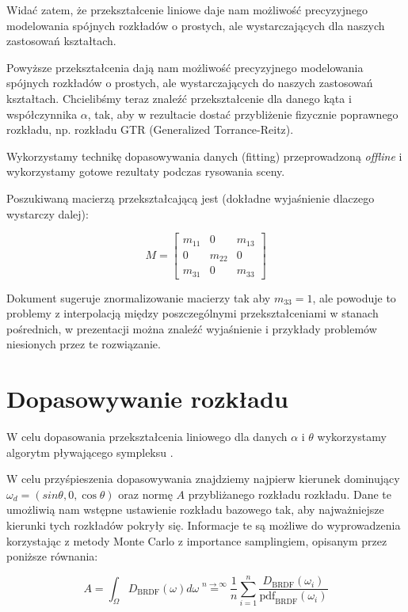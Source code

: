 \documentclass[../main.tex]{subfiles}
\begin{document}
Widać zatem, że przekształcenie liniowe daje nam możliwość precyzyjnego
modelowania spójnych rozkładów o prostych, ale wystarczających dla naszych
zastosowań kształtach.

Powyższe przekształcenia dają nam możliwość precyzyjnego modelowania
spójnych rozkładów o prostych, ale wystarczających do naszych zastosowań
kształtach. Chcielibśmy teraz znaleźć przekształcenie dla danego kąta
i współczynnika $\alpha$, tak, aby w rezultacie dostać przybliżenie
fizycznie poprawnego rozkładu, np. rozkładu GTR (Generalized
Torrance-Reitz).

Wykorzystamy technikę dopasowywania danych (fitting) przeprowadzoną
\textit{offline} i wykorzystamy gotowe rezultaty podczas rysowania sceny.

Poszukiwaną macierzą przekształcającą jest (dokładne wyjaśnienie dlaczego
wystarczy dalej):

$$
M =
\begin{bmatrix}
  m_{11} & 0 & m_{13} \\
  0 & m_{22} & 0 \\
  m_{31} & 0 & m_{33}
\end{bmatrix}
$$

Dokument \cite{ltc_heitz} sugeruje znormalizowanie macierzy tak aby $m_{33}=1$,
ale powoduje to problemy z interpolacją między poszczególnymi przekształceniami
w stanach pośrednich, w prezentacji \cite{LTCJourneyPresentation} można znaleźć
wyjaśnienie i przykłady problemów niesionych przez te rozwiązanie.

\section{Dopasowywanie rozkładu}

W celu dopasowania przekształcenia liniowego dla danych $\alpha$
i $\theta$ wykorzystamy algorytm pływającego sympleksu \cite{NelderMead65}.

W celu przyśpieszenia dopasowywania znajdziemy najpierw kierunek dominujący
  $\omega_d = \left(sin\theta, 0, \cos\theta\right)$
oraz normę $A$ przybliżanego rozkładu rozkładu. Dane te umożliwią nam wstępne
ustawienie rozkładu bazowego tak, aby najważniejsze kierunki tych rozkładów
pokryły się. Informacje te są możliwe do wyprowadzenia korzystając z metody
Monte Carlo z importance samplingiem, opisanym przez poniższe równania:

$$
A = \int_{\Omega} D_{\text{BRDF}}(\omega)d\omega
\stackrel{n \rightarrow \infty}{=}
\frac{1}{n} \sum_{i=1}^{n} {
  \frac{
    D_{\text{BRDF}}(\omega_i)
  }{
    \text{pdf}_{\text{BRDF}}(\omega_i)
  }
}
$$
\end{document}
